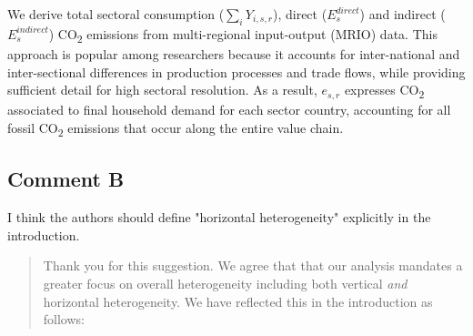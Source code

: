 \documentclass[11pt]{article}
\newenvironment{response}
{\begin{quote}\color{black}}
{\end{quote}}
\begin{document}
\begin{revisionbox}
    We derive total sectoral consumption ($\sum_{i} Y_{i,s,r}$), direct ($E_{s}^{direct}$) and indirect ($E_{s}^{indirect}$) CO\textsubscript{2} emissions from  multi-regional input-output (MRIO) data. This approach is popular among researchers because it accounts for inter-national and inter-sectional differences in production processes and trade flows, while providing sufficient detail for high sectoral resolution. As a result, $e_{s,r}$ expresses CO\textsubscript{2} associated to final household demand for each sector country, accounting for all fossil CO\textsubscript{2} emissions that occur along the entire value chain.
\end{revisionbox}


\subsection*{Comment B}\label{comment_R1_B}

\begin{commentbox}
    I think the authors should define "horizontal heterogeneity" explicitly in the introduction.
\end{commentbox}

\begin{response}
    Thank you for this suggestion. We agree that that our analysis mandates a greater focus on overall heterogeneity including both vertical \textit{and} horizontal heterogeneity. We have reflected this in the introduction as follows:
    
\end{response}
\end{document}
